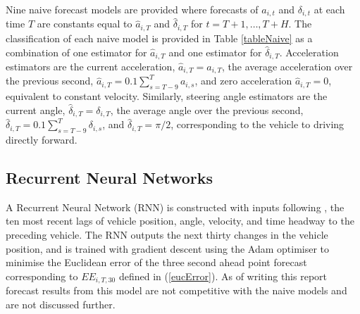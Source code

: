\documentclass[12pt,a4paper]{article}\usepackage[]{graphicx}\usepackage[]{color}
\begin{document}
Nine naive forecast models are provided where forecasts of $a_{i, t}$ and $\delta_{i, t}$ at each time $T$ are constants equal to $\hat{a}_{i, T}$ and $\hat{\delta}_{i, T}$ for $t = T+1, \dots, T+H$. The classification of each naive model is provided in Table \ref{tableNaive} as a combination of one estimator for $\hat{a}_{i, T}$ and one estimator for $\hat{\delta}_{i, T}$. Acceleration estimators are the current acceleration, $\hat{a}_{i, T} = a_{i, T}$, the average acceleration over the previous second, $\hat{a}_{i, T} = 0.1 \sum_{s = T-9}^T a_{i, s}$, and zero acceleration $\hat{a}_{i, T} = 0$, equivalent to constant velocity. Similarly, steering angle estimators are the current angle, $\hat{\delta}_{i, T} = \delta_{i, T}$, the average angle over the previous second, $\hat{\delta}_{i, T} = 0.1 \sum_{s = T - 9}^T \delta_{i, s}$, and $\hat{\delta}_{i, T} = \pi/2$, corresponding to the vehicle to driving directly forward.
\begin{table}
\begin{center}
\end{center}
\caption{Classification of naive forecast models by future acceleration and steering angle estimators.}
\label{tableNaive}
\end{table}

\subsection{Recurrent Neural Networks}
\label{subsec:RNN}
A Recurrent Neural Network (RNN) is constructed with inputs following \citet{Ding2013}, the ten most recent lags of vehicle position, angle, velocity, and time headway to the preceding vehicle. The RNN outputs the next thirty changes in the vehicle position, and is trained with gradient descent using the Adam optimiser to minimise the Euclidean error of the three second ahead point forecast corresponding to $EE_{i, T, 30}$ defined in (\ref{eucError}). As of writing this report forecast results from this model are not competitive with the naive models and are not discussed further.
\end{document}
